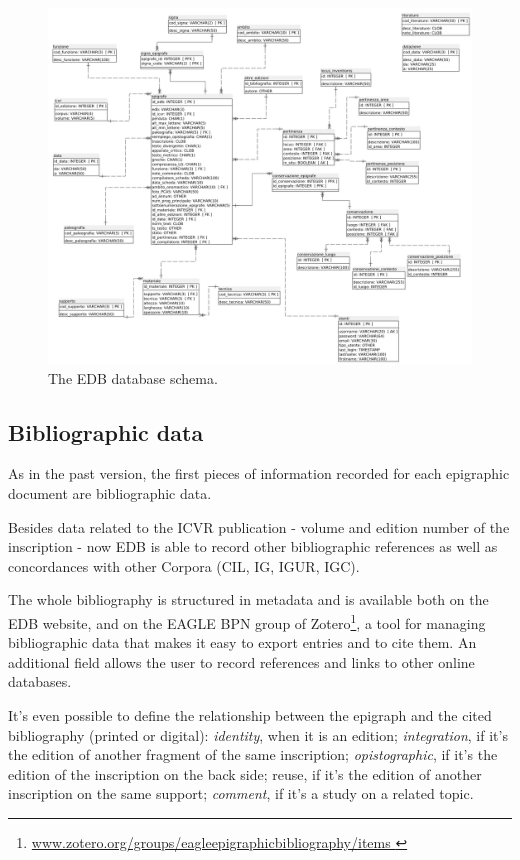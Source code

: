 \documentclass[amsthm,ebook]{saparticle}
\begin{document}
\begin{figure}[hbp]
\centering
 \includegraphics[width=\columnwidth]{EAGLE2016Roccoengrev-img004.png} 
\caption{The EDB database schema.}
\label{fig:4}
\end{figure}




\subsection{Bibliographic data}


As in the past version, the first pieces of information recorded for each epigraphic document are bibliographic data.

Besides data related to the ICVR publication - volume and edition number of the inscription - now EDB is able to record
other bibliographic references as well as concordances with other Corpora (CIL, IG, IGUR, IGC). 

The whole bibliography is structured in metadata and is available both on the EDB website, and on the EAGLE BPN group of
Zotero\footnote{ \url{www.zotero.org/groups/eagleepigraphicbibliography/items }}, a tool for managing bibliographic data that
makes it easy to export entries and to cite them. An additional field allows the user to record references and links to
other online databases. 

It's even possible to define the relationship between the epigraph and the cited bibliography (printed or digital):
\emph{identity}, when it is an edition; \emph{integration}, if it's the edition of another fragment of the same inscription;
\emph{opistographic}, if it's the edition of the inscription on the back side; reuse, if it's the edition of another
inscription on the same support; \emph{comment}, if it's a study on a related topic.
\end{document}
